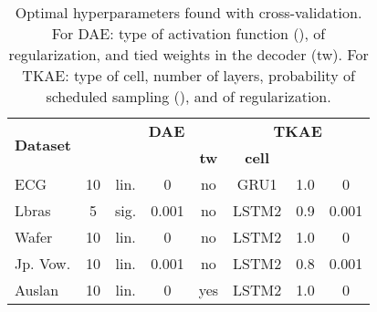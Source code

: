 \documentclass[a4paper,10pt,pdftex]{article}
\begin{document}
\bgroup
\def\arraystretch{0.9} \setlength\tabcolsep{.3em} \begin{table*}[!ht]
\footnotesize
\centering
\caption{Optimal hyperparameters found with cross-validation. For DAE: type of activation function (),  of  regularization, and tied weights in the decoder (tw). For TKAE: type of cell, number of layers, probability of scheduled sampling (), and  of  regularization.}
\label{tab:imp_config}
\begin{tabular}{lc|ccc|ccc}
\cmidrule[1.5pt]{1-8}
\multirow{ 2}{*}{\textbf{Dataset}} & \multirow{ 2}{*}{} & \multicolumn{3}{c|}{\textbf{DAE}} & \multicolumn{3}{c}{\textbf{TKAE}} \\
& &  &   & \textbf{tw} & \textbf{cell} &  &  \\
\cmidrule[.5pt]{1-8}
ECG         & 10 & lin. & 0     & no  & GRU1  & 1.0 & 0     \\ 
Lbras       & 5  & sig. & 0.001 & no  & LSTM2 & 0.9 & 0.001 \\ 
Wafer       & 10 & lin. & 0     & no  & LSTM2 & 1.0 & 0     \\ 
Jp. Vow.    & 10 & lin. & 0.001 & no  & LSTM2 & 0.8 & 0.001 \\ 
Auslan      & 10 & lin. & 0     & yes & LSTM2 & 1.0 & 0     \\ 
\cmidrule[1.5pt]{1-8}
\end{tabular}
\end{table*}
\egroup
\end{document}
